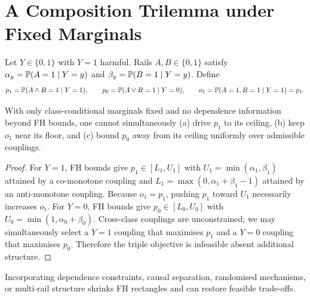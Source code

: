 \section{A Composition Trilemma under Fixed Marginals}

\begin{definition}[Quantities]
Let $Y\in\{0,1\}$ with $Y=1$ harmful. Rails $A,B\in\{0,1\}$ satisfy
$\alpha_y=\mathbb{P}(A=1\mid Y=y)$ and $\beta_y=\mathbb{P}(B=1\mid Y=y)$. Define
\[
p_1=\mathbb{P}(A\wedge B=1\mid Y=1),\qquad
p_0=\mathbb{P}(A\vee B=1\mid Y=0),\qquad
o_1=\mathbb{P}(A=1,B=1\mid Y=1)=p_1.
\]
\end{definition}

\begin{theorem}[Trilemma]\label{thm:trilemma}
With only class-conditional marginals fixed and no dependence information beyond FH bounds,
one cannot simultaneously (a) drive $p_1$ to its ceiling, (b) keep $o_1$ near its floor,
and (c) bound $p_0$ away from its ceiling uniformly over admissible couplings.
\end{theorem}

\begin{proof}
For $Y=1$, FH bounds give $p_1\in[L_1,U_1]$ with $U_1=\min(\alpha_1,\beta_1)$ attained by a
co-monotone coupling and $L_1=\max(0,\alpha_1+\beta_1-1)$ attained by an anti-monotone coupling.
Because $o_1=p_1$, pushing $p_1$ toward $U_1$ necessarily increases $o_1$. For $Y=0$, FH bounds give
$p_0\in[L_0,U_0]$ with $U_0=\min(1,\alpha_0+\beta_0)$. Cross-class couplings are unconstrained; we may
simultaneously select a $Y=1$ coupling that maximises $p_1$ and a $Y=0$ coupling that maximises $p_0$.
Therefore the triple objective is infeasible absent additional structure.
\end{proof}

\begin{remark}[Escapes]
Incorporating dependence constraints, causal separation, randomised mechanisms, or multi-rail structure
shrinks FH rectangles and can restore feasible trade-offs.
\end{remark}
